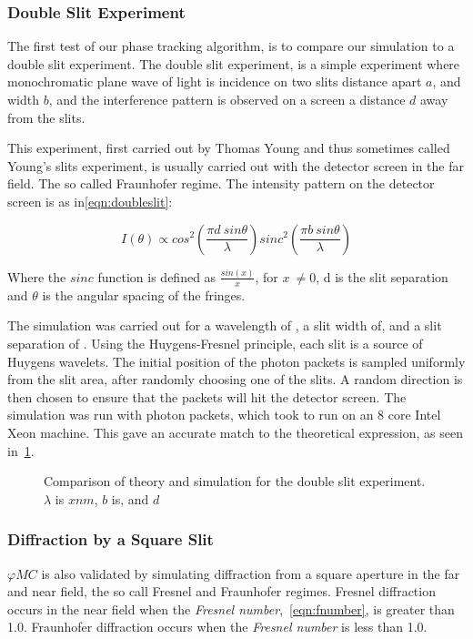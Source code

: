 \subsubsection*{Double Slit Experiment}

The first test of our phase tracking algorithm, is to compare our simulation to a double slit experiment.
The double slit experiment, is a simple experiment where monochromatic plane wave of light is incidence on two slits distance apart $a$, and width $b$, and the interference pattern is observed on a screen a distance $d$ away from the slits.

This experiment, first carried out by Thomas Young and thus sometimes called Young's slits experiment, is usually carried out with the detector screen in the far field. The so called Fraunhofer regime.
The intensity pattern on the detector screen is as in\cref{eqn:doubleslit}:

\begin{equation}
    I(\theta) \propto cos^2\left(\frac{\pi d\ sin \theta}{\lambda}\right)sinc^2\left(\frac{\pi b\ sin\theta}{\lambda}\right)
    \label{eqn:doubleslit}
\end{equation}

Where the $sinc$ function is defined as $\tfrac{sin(x)}{x}$, for $x\ \neq 0$, d is the slit separation and $\theta$ is the angular spacing of the fringes.

The simulation was carried out for a wavelength of , a slit width of, and a slit separation of .
Using the Huygens-Fresnel principle, each slit is a source of Huygens wavelets.
The initial position of the photon packets is sampled uniformly from the slit area, after randomly choosing one of the slits.
A random direction is then chosen to ensure that the packets will hit the detector screen.
The simulation was run with photon packets, which took to run on an 8 core Intel Xeon machine.
This gave an accurate match to the theoretical expression, as seen in~\cref{fig:doubleslitcomp}.


\begin{figure}[!ht]
    \centering
    \caption{Comparison of theory and simulation for the double slit experiment. $\lambda$ is $x nm$, $b$ is, and $d$}
    \label{fig:doubleslitcomp}
\end{figure}

\subsubsection*{Diffraction by a Square Slit}
$\varphi MC$ is also validated by simulating diffraction from a square aperture in the far and near field, the so call Fresnel and Fraunhofer regimes. 
Fresnel diffraction occurs in the near field when the \textit{Fresnel number},~\cref{eqn:fnumber}, is greater than 1.0.
Fraunhofer diffraction occurs when the \textit{Fresnel number} is less than 1.0.

